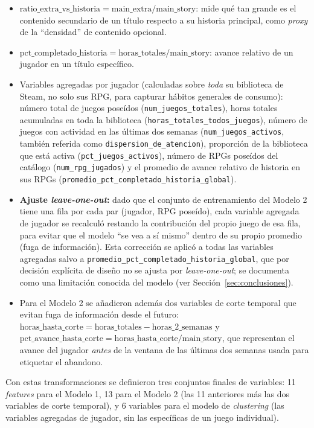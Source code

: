 \documentclass[11pt,letterpaper]{article}
\newcommand{\code}[1]{\texttt{\small #1}}
\begin{document}
\begin{itemize}
  \item \(\text{ratio\_extra\_vs\_historia} = \text{main\_extra} / \text{main\_story}\): mide qué tan grande es el contenido secundario de un título respecto a su historia principal, como \textit{proxy} de la ``densidad'' de contenido opcional.
  \item \(\text{pct\_completado\_historia} = \text{horas\_totales} / \text{main\_story}\): avance relativo de un jugador en un título específico.
  \item Variables agregadas por jugador (calculadas sobre \emph{toda} su biblioteca de Steam, no solo sus RPG, para capturar hábitos generales de consumo): número total de juegos poseídos (\code{num\_juegos\_totales}), horas totales acumuladas en toda la biblioteca (\code{horas\_totales\_todos\_juegos}), número de juegos con actividad en las últimas dos semanas (\code{num\_juegos\_activos}, también referida como \code{dispersion\_de\_atencion}), proporción de la biblioteca que está activa (\code{pct\_juegos\_activos}), número de RPGs poseídos del catálogo (\code{num\_rpg\_jugados}) y el promedio de avance relativo de historia en sus RPGs (\code{promedio\_pct\_completado\_historia\_global}).
  \item \textbf{Ajuste \textit{leave-one-out}:} dado que el conjunto de entrenamiento del Modelo 2 tiene una fila por cada par (jugador, RPG poseído), cada variable agregada de jugador se recalculó restando la contribución del propio juego de esa fila, para evitar que el modelo ``se vea a sí mismo'' dentro de su propio promedio (fuga de información). Esta corrección se aplicó a todas las variables agregadas salvo a \code{promedio\_pct\_completado\_historia\_global}, que por decisión explícita de diseño no se ajusta por \textit{leave-one-out}; se documenta como una limitación conocida del modelo (ver Sección~\ref{sec:conclusiones}).
  \item Para el Modelo 2 se añadieron además dos variables de corte temporal que evitan fuga de información desde el futuro: \(\text{horas\_hasta\_corte} = \text{horas\_totales} - \text{horas\_2\_semanas}\) y \(\text{pct\_avance\_hasta\_corte} = \text{horas\_hasta\_corte} / \text{main\_story}\), que representan el avance del jugador \emph{antes} de la ventana de las últimas dos semanas usada para etiquetar el abandono.
\end{itemize}

Con estas transformaciones se definieron tres conjuntos finales de variables: 11 \textit{features} para el Modelo 1, 13 para el Modelo 2 (las 11 anteriores más las dos variables de corte temporal), y 6 variables para el modelo de \textit{clustering} (las variables agregadas de jugador, sin las específicas de un juego individual).
\end{document}
